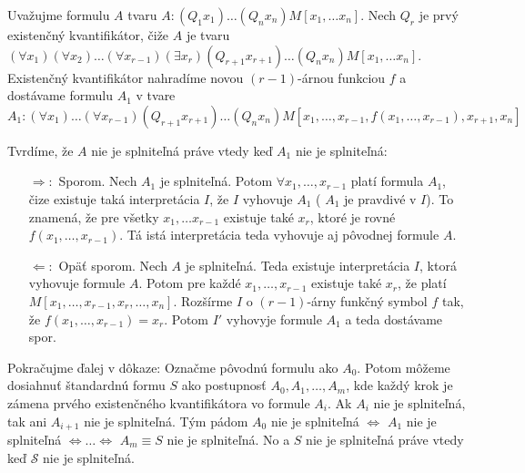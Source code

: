 \begin{dokaz}
    Uvažujme formulu $A$ tvaru $A: (Q_1 x_1) \dots (Q_n x_n) M[x_1, \dots x_n]$.
    Nech $Q_r$ je prvý existenčný kvantifikátor, čiže $A$ je tvaru
    $(\forall x_1) (\forall x_2) \dots (\forall x_{r-1}) (\exists x_r)
     (Q_{r+1} x_{r+1}) \dots (Q_n x_n) M[x_1, \dots x_n]$.
    Existenčný kvantifikátor nahradíme novou $(r-1)$-árnou funkciou $f$ a
    dostávame formulu $A_1$ v tvare
    \begin{equation*}
        A_1: (\forall x_1) \dots (\forall x_{r-1}) (Q_{r+1} x_{r+1})  \dots (Q_n x_n)
                M[x_1, \dots, x_{r-1}, f(x_1, \dots, x_{r-1}), x_{r+1}, x_n]
    \end{equation*}

    \noindent Tvrdíme, že $A$ nie je splniteľná práve vtedy keď $A_1$ nie je splniteľná:
    \begin{itemize}
    \item[$\Rightarrow:$] Sporom. Nech $A_1$ je splniteľná.
        Potom $\forall x_1,\dots,x_{r-1}$ platí formula $A_1$, čize
        existuje taká interpretácia $I$, že $I$ vyhovuje $A_1$ ( $A_1$ je pravdivé v $I$).
        To znamená, že pre všetky $x_1 , \dots x_{r-1}$ existuje také $x_r$,
        ktoré je rovné $f(x_1, \dots, x_{r-1})$.
        Tá istá interpretácia teda vyhovuje aj pôvodnej formule $A$.

    \item[$\Leftarrow:$] Opäť sporom. Nech $A$ je splniteľná.
        Teda existuje interpretácia $I$, ktorá vyhovuje formule $A$.
        Potom pre každé $x_1, \dots, x_{r-1}$ existuje také $x_r$, že platí 
        $M[x_1, \dots, x_{r-1}, x_r, \dots, x_n]$.
        Rozšírme $I$ o $(r-1)$-árny funkčný 
        symbol $f$ tak, že $f(x_1, \dots, x_{r-1}) = x_r$. Potom $I'$
        vyhovyje formule $A_1$ a teda dostávame spor.
    \end{itemize}

    \noindent Pokračujme ďalej v dôkaze:
    Označme pôvodnú formulu ako $A_0$. Potom môžeme dosiahnuť štandardnú formu
    $S$ ako postupnosť $A_0, A_1, \dots, A_m$, kde každý krok je zámena prvého
    existenčného kvantifikátora vo formule $A_i$.
    Ak $A_i$ nie je splniteľná, tak ani $A_{i+1}$ nie je splniteľná.
    Tým pádom $A_0$ nie je splniteľná $\iff$ $A_1$ nie je splniteľná $\iff
    \dots \iff$ $A_m\equiv S$ nie je splniteľná.
    No a $S$ nie je splniteľná práve vtedy keď $\mathscr{S}$ nie je
    splniteľná.
\end{dokaz}

